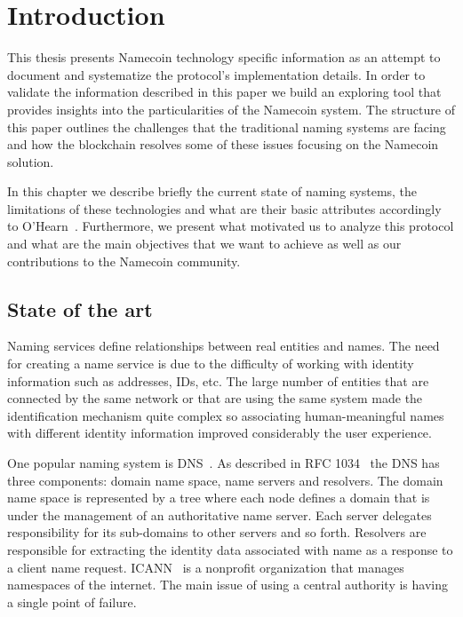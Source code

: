 \chapter{Introduction}
\label{chapter:intro}
This thesis presents Namecoin technology specific information as an attempt to document and systematize the protocol's implementation details. In order to validate the information described in this paper we build an exploring tool that provides insights into the particularities of the Namecoin system. The structure of this paper outlines the challenges that the traditional naming systems are facing and how the blockchain resolves some of these issues focusing on the Namecoin solution.

In this chapter we describe briefly the current state of naming systems, the limitations of these technologies and what are their basic attributes accordingly to O’Hearn~\cite{wilcox2001names}.
Furthermore, we present what motivated us to analyze this protocol and what are the main objectives that we want to achieve as well as our contributions to the Namecoin community. 

%
\section{State of the art}
\label{sec:state-of-art-lbl}
Naming services define relationships between real entities and names. The need for creating a name service is due to the difficulty of working with identity information such as addresses, IDs, etc. The large number of entities that are connected by the same network or that are using the same system made the identification mechanism quite complex so associating human-meaningful names with different identity information improved considerably the user experience.

One popular naming system is DNS~. As described in RFC 1034~\cite{rfc1034} the DNS has three components: domain name space, name servers and resolvers. The domain name space is represented by a tree where each node defines a domain that is under the management of an authoritative name server. Each server delegates responsibility for its sub-domains to other servers and so forth. Resolvers are responsible for extracting the identity data associated with name as a response to a client name request. ICANN~ is a nonprofit organization that manages namespaces of the internet. The main issue of using a central authority is having a single point of failure.

